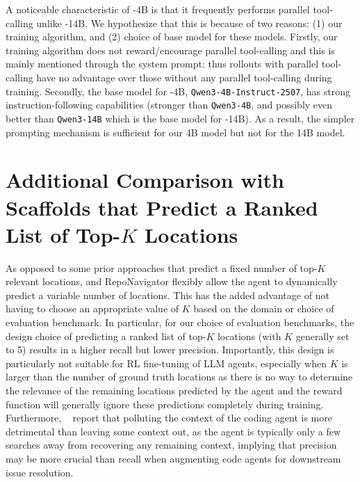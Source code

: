 A noticeable characteristic of \methodname-4B is that it frequently performs parallel tool-calling unlike \methodname-14B. We hypothesize that this is because of two reasons: (1) our training algorithm, and (2) choice of base model for these models. Firstly, our training algorithm does not reward/encourage parallel tool-calling and this is mainly mentioned through the system prompt: thus rollouts with parallel tool-calling have no advantage over those without any parallel tool-calling during training. Secondly, the base model for \methodname-4B, \texttt{Qwen3-4B-Instruct-2507}, has strong instruction-following capabilities (stronger than \texttt{Qwen3-4B}, and possibly even better than \texttt{Qwen3-14B} which is the base model for \methodname-14B). As a result, the simpler prompting mechanism is sufficient for our 4B model but not for the 14B model.

\section{Additional Comparison with Scaffolds that Predict a Ranked List of Top-$K$ Locations}\label{appendix:topk_discussion}
As opposed to some prior approaches that predict a fixed number of top-$K$ relevant locations, \methodname and RepoNavigator \citep{zhang2025one} flexibly allow the agent to dynamically predict a variable number of locations. This has the added advantage of not having to choose an appropriate value of $K$ based on the domain or choice of evaluation benchmark. In particular, for our choice of evaluation benchmarks, the design choice of predicting a ranked list of top-$K$ locations (with $K$ generally set to 5) results in a higher recall but lower precision. Importantly, this design is particularly not suitable for RL fine-tuning of LLM agents, especially when $K$ is larger than the number of ground truth locations as there is no way to determine the relevance of the remaining locations predicted by the agent and the reward function will generally ignore these predictions completely during training. Furthermore, ~\citet{cognition2025swegrep} report that polluting the context of the coding agent is more detrimental than leaving some context out, as the agent is typically only a few searches away from recovering any remaining context, implying that precision may be more crucial than recall when augmenting code agents for downstream issue resolution.

